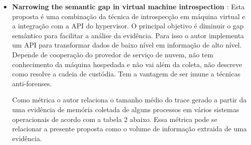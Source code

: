 \documentclass[
	12pt,				%
	openright,			%
	oneside,			%
	a4paper,			%
	english,			%
	french,				%
	spanish,			%
	brazil,				%
	]{abntex2}
\begin{document}
\begin{itemize}
\item \textbf{Narrowing the semantic gap in virtual machine introspection \cite{Dolan-Gavitt2011a} }: Esta proposta é uma combinação da técnica de introspecção em máquina virtual
e a integração com a API do hypervisor. O principal objetivo é diminuir o gap semântico para facilitar a análise da evidência. Para isso o autor implementa um API para transformar
dados de baixo nível em informação de alto nível. Depende de cooperação do provedor de serviço de nuvem, não tem conhecimento da máquina hospedada e não vai além da coleta, não 
descreve como resolve a cadeia de custódia. Tem a vantagem de ser imune a técnicas anti-forenses.

Como métrica o autor relaciona o tamanho médio do trace gerado a partir da uma evidência de memória coletada de alguns processos em vários sistemas operacionais de acordo 
com a tabela 2 abaixo. Essa métrica pode se relacionar a presente proposta como o volume de informação extraida de uma evidência.


\end{itemize}
\end{document}
